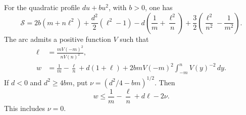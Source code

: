 \begin{lemma}
\label{model:Riccati}
For the quadratic profile \(du+bu^2\), with \(b>0\), one has
\begin{equation}
 \mathcal S
 =2b(m+n\ell^2)+\frac{d^2}{2}(\ell^2-1)
   -d\left(\frac1m+\frac{\ell^2}{n}\right)
   +\frac32\left(\frac{\ell^2}{n^2}-\frac1{m^2}\right).
 \label{model:Schwarzian-formula}
\end{equation}
The arc admits a positive function \(V\) such that
\begin{align}
 \ell&=\frac{mV(-m)^2}{nV(n)^2},\nonumber\\
 w&=\frac1m-\frac{\ell}{n}+d(1+\ell)
       +2bmV(-m)^2\int_{-m}^{n}V(y)^{-2}\,dy.
 \label{model:variation-formulas}
\end{align}
If \(d<0\) and \(d^2\ge4bm\), put
\(\nu=(d^2/4-bm)^{1/2}\).  Then
\begin{equation}
 w\le\frac1m-\frac{\ell}{n}+d\ell-2\nu.
 \label{model:Riccati-bound}
\end{equation}
This includes \(\nu=0\).
\end{lemma}

